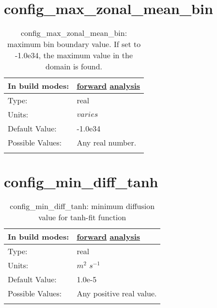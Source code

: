 \section[config\_max\_zonal\_mean\_bin]{config\_max\_zonal\_mean\_bin}
\label{sec:nm_sec_config_max_zonal_mean_bin}
\begin{center}
\begin{longtable}{| p{2.0in} || p{4.0in} |}
    \hline
    In build modes: & \hyperref[subsec:forward_nm_tab_zonal_mean]{forward} \hyperref[subsec:analysis_nm_tab_zonal_mean]{analysis} \\
    \hline
    Type: & real \\
    \hline
    Units: & $varies$ \\
    \hline
    Default Value: & -1.0e34 \\
    \hline
    Possible Values: & Any real number. \\
    \hline
    \caption{config\_max\_zonal\_mean\_bin: maximum bin boundary value.  If set to -1.0e34, the maximum value in the domain is found.}
\end{longtable}
\end{center}
\section[config\_min\_diff\_tanh]{config\_min\_diff\_tanh}
\label{sec:nm_sec_config_min_diff_tanh}
\begin{center}
\begin{longtable}{| p{2.0in} || p{4.0in} |}
    \hline
    In build modes: & \hyperref[subsec:forward_nm_tab_vmix_tanh]{forward} \hyperref[subsec:analysis_nm_tab_vmix_tanh]{analysis} \\
    \hline
    Type: & real \\
    \hline
    Units: & $m^2$ $s^{-1}$ \\
    \hline
    Default Value: & 1.0e-5 \\
    \hline
    Possible Values: & Any positive real value. \\
    \hline
    \caption{config\_min\_diff\_tanh: minimum diffusion value for tanh-fit function}
\end{longtable}
\end{center}
